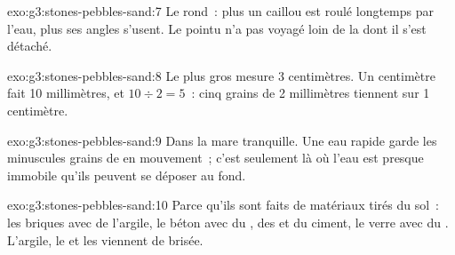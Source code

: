 \begin{solution}{exo:g3:stones-pebbles-sand:7}
Le rond~: plus un caillou est roulé longtemps par l'eau, plus ses angles
s'usent. Le pointu n'a pas voyagé loin de la  dont il s'est détaché.
\end{solution}

\begin{solution}{exo:g3:stones-pebbles-sand:8}
Le plus gros  mesure 3 centimètres. Un centimètre fait
10 millimètres, et $10 \div 2 = 5$~: cinq grains de 2 millimètres tiennent
sur 1 centimètre.
\end{solution}

\begin{solution}{exo:g3:stones-pebbles-sand:9}
Dans la mare tranquille. Une eau rapide garde les minuscules grains de
 en mouvement~; c'est seulement là où l'eau est presque immobile qu'ils
peuvent se déposer au fond.
\end{solution}

\begin{solution}{exo:g3:stones-pebbles-sand:10}
Parce qu'ils sont faits de matériaux tirés du sol~: les briques avec de
l'argile, le béton avec du , des  et du ciment, le verre avec
du . L'argile, le  et les  viennent de  brisée.
\end{solution}
